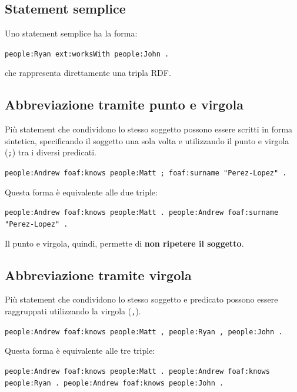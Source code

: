 \subsection*{Statement semplice}

Uno statement semplice ha la forma:

\begin{center}
\texttt{people:Ryan ext:worksWith people:John .}
\end{center}

che rappresenta direttamente una tripla RDF.

\subsection*{Abbreviazione tramite punto e virgola}

Più statement che condividono lo stesso soggetto possono essere scritti in forma sintetica, specificando il soggetto una sola volta e utilizzando il punto e virgola (\texttt{;}) tra i diversi predicati.

\begin{center}
\texttt{people:Andrew foaf:knows people:Matt ;}\
\texttt{\phantom{people:Andrew }foaf:surname "Perez-Lopez" .}
\end{center}

Questa forma è equivalente alle due triple:

\begin{center}
\texttt{people:Andrew foaf:knows people:Matt .}\
\texttt{people:Andrew foaf:surname "Perez-Lopez" .}
\end{center}

Il punto e virgola, quindi, permette di \textbf{non ripetere il soggetto}.

\subsection*{Abbreviazione tramite virgola}

Più statement che condividono lo stesso soggetto e predicato possono essere raggruppati utilizzando la virgola (\texttt{,}).

\begin{center}
\texttt{people:Andrew foaf:knows people:Matt , people:Ryan , people:John .}
\end{center}

Questa forma è equivalente alle tre triple:

\begin{center}
\texttt{people:Andrew foaf:knows people:Matt .}\
\texttt{people:Andrew foaf:knows people:Ryan .}\
\texttt{people:Andrew foaf:knows people:John .}
\end{center}

